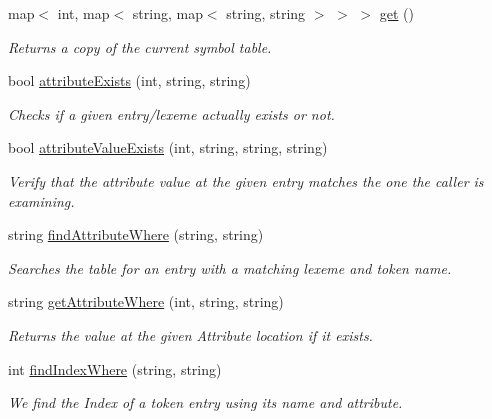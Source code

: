 \begin{DoxyCompactItemize}
map$<$ int, map$<$ string, map$<$ string, string $>$ $>$ $>$ \hyperlink{classSymbolTable_ad9429553f1aadeade3339e32e4f4c61e}{get} ()
\begin{DoxyCompactList}\small\item\em Returns a copy of the current symbol table. \item\end{DoxyCompactList}\item 
bool \hyperlink{classSymbolTable_af93b3c97308b5cfe7661e57b83d8dc35}{attributeExists} (int, string, string)
\begin{DoxyCompactList}\small\item\em Checks if a given entry/lexeme actually exists or not. \item\end{DoxyCompactList}\item 
bool \hyperlink{classSymbolTable_a7df0fef90bee097810b553ad2e1c6cec}{attributeValueExists} (int, string, string, string)
\begin{DoxyCompactList}\small\item\em Verify that the attribute value at the given entry matches the one the caller is examining. \item\end{DoxyCompactList}\item 
string \hyperlink{classSymbolTable_a0b0bdb5b1a6095782c6c4f318737a0a9}{findAttributeWhere} (string, string)
\begin{DoxyCompactList}\small\item\em Searches the table for an entry with a matching lexeme and token name. \item\end{DoxyCompactList}\item 
string \hyperlink{classSymbolTable_aa5e55d23f3b69e48a8e6c385bd9d509f}{getAttributeWhere} (int, string, string)
\begin{DoxyCompactList}\small\item\em Returns the value at the given Attribute location if it exists. \item\end{DoxyCompactList}\item 
int \hyperlink{classSymbolTable_a61a3da421ef79fffe47e8e2d3065bb05}{findIndexWhere} (string, string)
\begin{DoxyCompactList}\small\item\em We find the Index of a token entry using its name and attribute. \item\end{DoxyCompactList}\item 

\end{DoxyCompactItemize}
